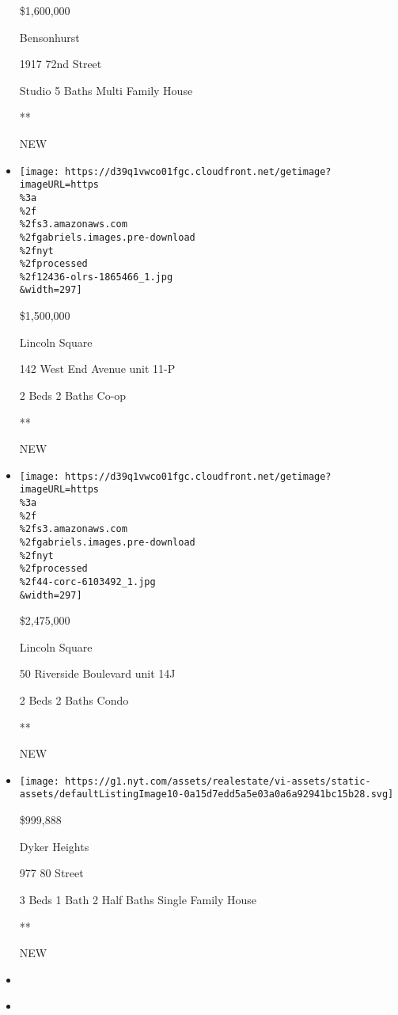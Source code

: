 \begin{itemize}
  \$1,600,000

  Bensonhurst

  1917 72nd Street

  Studio \textbar{} 5 Baths \textbar{} Multi Family House

  **

  NEW
\item
  \href{/real-estate/usa/ny/new-york/lincoln-square/homes-for-sale/142-west-end-avenue/12436-OLRS-1865466?}{}

  \texttt{[image: https://d39q1vwco01fgc.cloudfront.net/getimage?imageURL=https\\\%3a\\\%2f\\\%2fs3.amazonaws.com\\\%2fgabriels.images.pre-download\\\%2fnyt\\\%2fprocessed\\\%2f12436-olrs-1865466\_1.jpg\\\&width=297]}

  \$1,500,000

  Lincoln Square

  142 West End Avenue unit 11-P

  2 Beds \textbar{} 2 Baths \textbar{} Co-op

  **

  NEW
\item
  \href{/real-estate/usa/ny/new-york/lincoln-square/homes-for-sale/50-riverside-boulevard/44-CORC-6103492?}{}

  \texttt{[image: https://d39q1vwco01fgc.cloudfront.net/getimage?imageURL=https\\\%3a\\\%2f\\\%2fs3.amazonaws.com\\\%2fgabriels.images.pre-download\\\%2fnyt\\\%2fprocessed\\\%2f44-corc-6103492\_1.jpg\\\&width=297]}

  \$2,475,000

  Lincoln Square

  50 Riverside Boulevard unit 14J

  2 Beds \textbar{} 2 Baths \textbar{} Condo

  **

  NEW
\item
  \href{/real-estate/usa/ny/brooklyn/dyker-heights/homes-for-sale/977-80-street/13063-5535117?}{}

  \texttt{[image: https://g1.nyt.com/assets/realestate/vi-assets/static-assets/defaultListingImage10-0a15d7edd5a5e03a0a6a92941bc15b28.svg]}

  \$999,888

  Dyker Heights

  977 80 Street

  3 Beds \textbar{} 1 Bath \textbar{} 2 Half Baths \textbar{} Single
  Family House

  **

  NEW
\item
\item
  \href{/real-estate/usa/ny/brooklyn/gerritsen-beach/homes-for-sale/2280-burnett-street/14894-5535139?}{}


\end{itemize}
